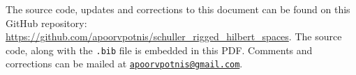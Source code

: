 \documentclass[12pt, a4 paper]{article}
\theoremstyle{definition}
\begin{document}
	\nocite{*}
	\printbibliography[heading=bibintoc]

	\par\begin{spacing}{0.6}
		{\footnotesize The source code, updates and corrections to this document can be found on this GitHub repository: \url{https://github.com/apoorvpotnis/schuller_rigged_hilbert_spaces}. The source code, along with the \texttt{.bib} file is embedded in this PDF. Comments and corrections can be mailed at \href{mailto:apoorvpotnis@gmail.com}{\texttt{apoorvpotnis@gmail.com}}.}
	\end{spacing}
\end{document}
